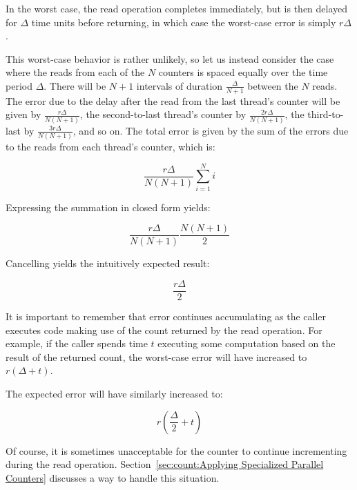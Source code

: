	In the worst case, the read operation completes immediately,
	but is then delayed for $\Delta$ time units before returning,
	in which case the worst-case error is simply $r \Delta$.

	This worst-case behavior is rather unlikely, so let us instead
	consider the case where the reads from each of the $N$
	counters is spaced equally over the time period $\Delta$.
	There will be $N+1$ intervals of duration $\frac{\Delta}{N+1}$
	between the $N$ reads.
	The error due to the delay after the read from the last thread's
	counter will be given by $\frac{r \Delta}{N \left( N + 1 \right)}$,
	the second-to-last thread's counter by
	$\frac{2 r \Delta}{N \left( N + 1 \right)}$,
	the third-to-last by
	$\frac{3 r \Delta}{N \left( N + 1 \right)}$,
	and so on.
	The total error is given by the sum of the errors due to the
	reads from each thread's counter, which is:

	\begin{equation}
		\frac{r \Delta}{N \left( N + 1 \right)}
			\sum_{i = 1}^N i
	\end{equation}

	Expressing the summation in closed form yields:

	\begin{equation}
		\frac{r \Delta}{N \left( N + 1 \right)}
			\frac{N \left( N + 1 \right)}{2}
	\end{equation}

	Cancelling yields the intuitively expected result:

	\begin{equation}
		\frac{r \Delta}{2}
	\label{eq:count:CounterErrorAverage}
	\end{equation}

	It is important to remember that error continues accumulating
	as the caller executes code making use of the count returned
	by the read operation.
	For example, if the caller spends time $t$ executing some
	computation based on the result of the returned count, the
	worst-case error will have increased to $r \left(\Delta + t\right)$.

	The expected error will have similarly increased to:

	\begin{equation}
		r \left( \frac{\Delta}{2} + t \right)
	\end{equation}

	Of course, it is sometimes unacceptable for the counter to
	continue incrementing during the read operation.
	Section~\ref{sec:count:Applying Specialized Parallel Counters}
	discusses a way to handle this situation.

